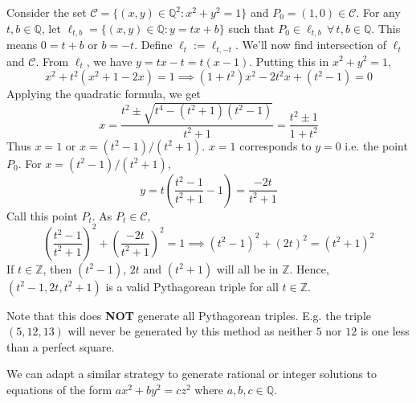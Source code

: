 Consider the set $\mathcal{C} = \{(x,y)\in\mathbb{Q}^2: x^2 + y^2 = 1\}$ and
$P_0 = (1,0)\in\mathcal{C}$. For any $t,b\in\mathbb{Q}$, let
$\ell_{t,b}=\{(x,y)\in\mathbb{Q}:y=tx+b\}$ such that
$P_0\in\ell_{t,b}\,\forall\,t,b\in\mathbb{Q}$. This means $0 = t + b$ or $b = -t$.
Define $\ell_t:=\ell_{t,-t}$. We'll now find intersection of $\ell_t$ and
$\mathcal{C}$. From $\ell_t$, we have $y = tx - t = t(x - 1)$. Putting this in
$x^2 + y^2 = 1$,
\[ x^2 + t^2(x^2 + 1 - 2x) = 1 \implies (1+t^2)x^2 - 2 t^2 x + (t^2 - 1) = 0 \]
Applying the quadratic formula, we get
\[
    x = \frac{t^2 \pm \sqrt{t^4 - (t^2+1)(t^2-1)}}{t^2+1}
    = \frac{t^2 \pm 1}{1 + t^2}
\]
Thus $x = 1$ or $x = (t^2-1)/(t^2+1)$. $x=1$ corresponds to $y=0$ i.e. the point
$P_0$. For $x = (t^2-1)/(t^2+1)$,
\[ y = t\left(\frac{t^2-1}{t^2+1}-1\right) = \frac{-2t}{t^2+1} \]
Call this point $P_t$. As $P_t\in\mathcal{C}$,
\[
    \left(\frac{t^2-1}{t^2+1}\right)^2 + \left(\frac{-2t}{t^2+1}\right)^2 = 1
    \implies (t^2-1)^2 + (2t)^2 = (t^2+1)^2
\]
If $t\in\mathbb{Z}$, then $(t^2-1)$, $2t$ and $(t^2+1)$ will all be in
$\mathbb{Z}$. Hence, $(t^2-1, 2t, t^2+1)$ is a valid Pythagorean triple
for all $t\in\mathbb{Z}$.

Note that this does \textbf{NOT} generate all Pythagorean triples. E.g. the triple
$(5,12,13)$ will never be generated by this method as neither $5$ nor $12$ is one
less than a perfect square.
\vspace{1ex}

We can adapt a similar strategy to generate rational or integer solutions to
equations of the form $ax^2+by^2=cz^2$ where $a,b,c\in\mathbb{Q}$.

